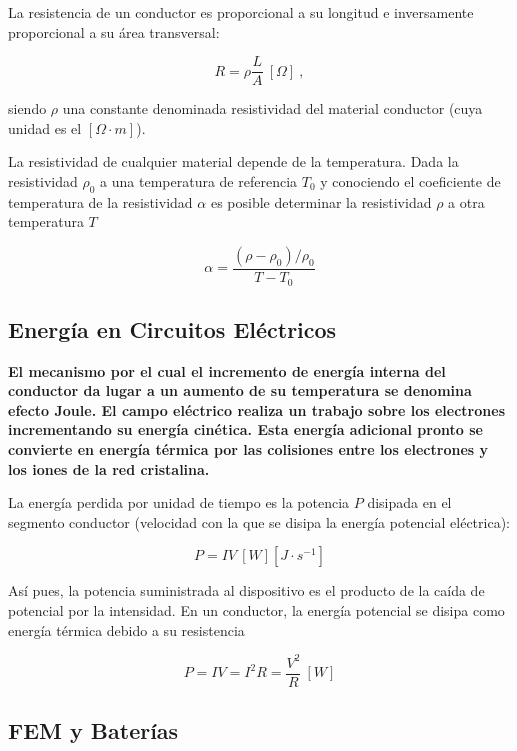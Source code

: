 \documentclass{tufte-handout}
\begin{document}
La resistencia de un conductor es proporcional a su longitud e inversamente proporcional a su área transversal:

\begin{equation}
R = \rho\frac{L}{A}~[\Omega]~,
\end{equation}

siendo $\rho$ una constante denominada resistividad del material conductor (cuya unidad es el $[\Omega\cdot m]$).

La resistividad de cualquier material depende de la temperatura. Dada la resistividad $\rho_0$ a una temperatura de referencia $T_0$ y conociendo el coeficiente de temperatura de la resistividad $\alpha$ es posible determinar la resistividad $\rho$ a otra temperatura $T$

\begin{equation}
\alpha = \frac{(\rho - \rho_0)/\rho_0}{T - T_0}
\end{equation}

\subsection{Energía en Circuitos Eléctricos}

\textbf{El mecanismo por el cual el incremento de energía interna del conductor da lugar a un aumento de su temperatura se denomina efecto Joule. El campo eléctrico realiza un trabajo sobre los electrones incrementando su energía cinética. Esta energía adicional pronto se convierte en energía térmica por las colisiones entre los electrones y los iones de la red cristalina.}

La energía perdida por unidad de tiempo es la potencia $P$ disipada en el segmento conductor (velocidad con la que se disipa la energía potencial eléctrica):

\begin{equation}
P = IV~[W][J\cdot s^{-1}]
\end{equation}

Así pues, la potencia suministrada al dispositivo es el producto de la caída de potencial por la intensidad. En un conductor, la energía potencial se disipa como energía térmica debido a su resistencia

\begin{equation}
P = IV = I^2R = \frac{V^2}{R}~[W]
\end{equation}

\subsection{FEM y Baterías}
\end{document}
